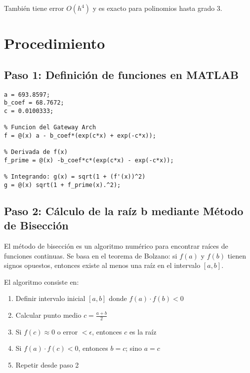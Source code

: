 \documentclass[conference]{IEEEtran}
\begin{document}
También tiene error $O(h^4)$ y es exacto para polinomios hasta grado 3.

\section{Procedimiento}

\subsection{Paso 1: Definición de funciones en MATLAB}

\begin{lstlisting}[caption={Definición de constantes y funciones}]
% Constantes del Gateway Arch
a = 693.8597;
b_coef = 68.7672;
c = 0.0100333;

% Funcion del Gateway Arch
f = @(x) a - b_coef*(exp(c*x) + exp(-c*x));

% Derivada de f(x)
f_prime = @(x) -b_coef*c*(exp(c*x) - exp(-c*x));

% Integrando: g(x) = sqrt(1 + (f'(x))^2)
g = @(x) sqrt(1 + f_prime(x).^2);
\end{lstlisting}

\subsection{Paso 2: Cálculo de la raíz b mediante Método de Bisección}

El método de bisección es un algoritmo numérico para encontrar raíces de funciones continuas. Se basa en el teorema de Bolzano: si $f(a)$ y $f(b)$ tienen signos opuestos, entonces existe al menos una raíz en el intervalo $[a,b]$.

El algoritmo consiste en:
\begin{enumerate}
    \item Definir intervalo inicial $[a, b]$ donde $f(a) \cdot f(b) < 0$
    \item Calcular punto medio $c = \frac{a+b}{2}$
    \item Si $f(c) \approx 0$ o error $< \epsilon$, entonces $c$ es la raíz
    \item Si $f(a) \cdot f(c) < 0$, entonces $b = c$; sino $a = c$
    \item Repetir desde paso 2
\end{enumerate}
\end{document}
